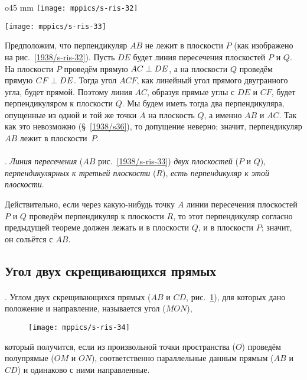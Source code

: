\begin{wrapfigure}{o}{45 mm}
\centering
\texttt{[image: mppics/s-ris-32]}
\caption{}\label{1938/s-ris-32}
\bigskip
\texttt{[image: mppics/s-ris-33]}
\caption{}\label{1938/s-ris-33}
\end{wrapfigure}

Предположим, что перпендикуляр $AB$ не лежит в плоскости $P$ (как изображено на рис.~\ref{1938/s-ris-32}).
Пусть $DE$ будет линия пересечения плоскостей $P$ и $Q$.
На плоскости $P$ проведём прямую $AC \z\perp DE$, а на плоскости $Q$ проведём прямую $CF \z\perp DE$.
Тогда угол $ACF$, как линейный угол прямого двугранного угла, будет прямой.
Поэтому линия $AC$, образуя прямые углы с $DE$ и $CF$, будет перпендикуляром к плоскости $Q$.
Мы будем иметь тогда два перпендикуляра, опущенные из одной и той же точки $A$ на плоскость $Q$, а именно $AB$ и $AC$.
Так как это невозможно (§~\ref{1938/s36}), то допущение неверно;
значит, перпендикуляр $AB$ лежит в плоскости~$P$.


\paragraph{}\label{1938/s45}
\mbox{.}
\emph{Линия пересечения} ($AB$ рис.~\ref{1938/s-ris-33}) \emph{двух плоскостей} ($P$ и $Q$), \emph{перпендикулярных к третьей плоскости} ($R$), \emph{есть перпендикуляр к этой плоскости}.

Действительно, если через какую-нибудь точку $A$ линии пересечения плоскостей $P$ и $Q$ проведём перпендикуляр к плоскости $R$, то этот перпендикуляр согласно предыдущей теореме должен лежать и в плоскости $Q$, и в плоскости $P$; значит, он сольётся с $AB$.



\subsection*{Угол двух скрещивающихся прямых}

\paragraph{}\label{1938/s46}
\mbox{.}
Углом двух скрещивающихся прямых ($AB$ и $CD$, рис.~\ref{1938/s-ris-34}), для которых дано положение и направление, называется угол ($MON$), 
\begin{figure}[!ht]
\vskip-0mm
\centering
\texttt{[image: mppics/s-ris-34]}
\caption{}\label{1938/s-ris-34}
\end{figure}
который получится, если из произвольной точки пространства ($O$) проведём полупрямые ($OM$ и $ON$), соответственно параллельные данным прямым ($AB$ и $CD$) и одинаково с ними направленные.


